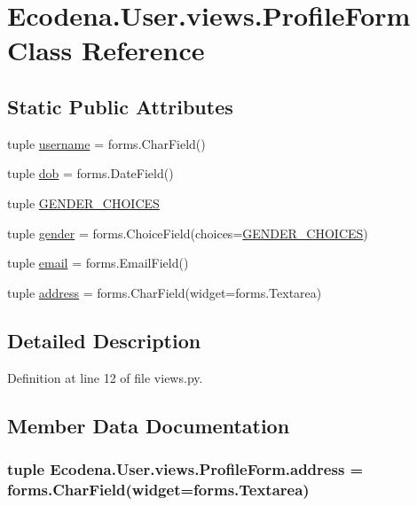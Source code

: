 \hypertarget{class_ecodena_1_1_user_1_1views_1_1_profile_form}{
\section{Ecodena.User.views.ProfileForm Class Reference}
\label{db/d79/class_ecodena_1_1_user_1_1views_1_1_profile_form}
}
\subsection*{Static Public Attributes}
\begin{DoxyCompactItemize}
\item 
tuple \hyperlink{class_ecodena_1_1_user_1_1views_1_1_profile_form_a73dce8ef060c7cea49bc252537828cc5}{username} = forms.CharField()
\item 
tuple \hyperlink{class_ecodena_1_1_user_1_1views_1_1_profile_form_a697b83b7d7dc1b7899bc1d9ee1b9344d}{dob} = forms.DateField()
\item 
tuple \hyperlink{class_ecodena_1_1_user_1_1views_1_1_profile_form_ac93f85620334a0793d3d177ea5ac43dd}{GENDER\_\-CHOICES}
\item 
tuple \hyperlink{class_ecodena_1_1_user_1_1views_1_1_profile_form_a943ea113aeb5c4ce8109a079119bb84e}{gender} = forms.ChoiceField(choices=\hyperlink{class_ecodena_1_1_user_1_1views_1_1_profile_form_ac93f85620334a0793d3d177ea5ac43dd}{GENDER\_\-CHOICES})
\item 
tuple \hyperlink{class_ecodena_1_1_user_1_1views_1_1_profile_form_add6304c2997c575733a2e1a47113752c}{email} = forms.EmailField()
\item 
tuple \hyperlink{class_ecodena_1_1_user_1_1views_1_1_profile_form_a11096920cec16a7bcfcfd320b42a6c94}{address} = forms.CharField(widget=forms.Textarea)
\end{DoxyCompactItemize}


\subsection{Detailed Description}


Definition at line 12 of file views.py.



\subsection{Member Data Documentation}
\hypertarget{class_ecodena_1_1_user_1_1views_1_1_profile_form_a11096920cec16a7bcfcfd320b42a6c94}{
\subsubsection[{address}]{\setlength{\rightskip}{0pt plus 5cm}tuple {\bf Ecodena.User.views.ProfileForm.address} = forms.CharField(widget=forms.Textarea)}}
\label{db/d79/class_ecodena_1_1_user_1_1views_1_1_profile_form_a11096920cec16a7bcfcfd320b42a6c94}


